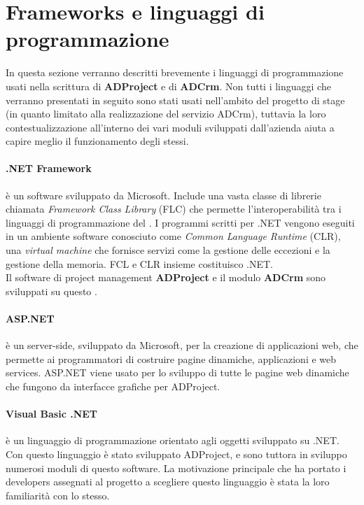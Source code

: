 \documentclass[12pt,a4paper,twoside,openright,english]{book}
\begin{document}
\section{Frameworks e linguaggi di programmazione}
In questa sezione verranno descritti brevemente i linguaggi di programmazione usati nella scrittura di \textbf{ADProject} e di \textbf{ADCrm}.
Non tutti i linguaggi che verranno presentati in seguito sono stati usati nell'ambito del progetto di stage (in quanto limitato alla realizzazione del servizio \large{ADCrm}), tuttavia la loro contestualizzazione all'interno dei vari moduli sviluppati dall'azienda aiuta a capire meglio il funzionamento degli stessi.

\paragraph{.NET Framework}
è un  software sviluppato da Microsoft. Include una vasta classe di librerie chiamata \textit{Framework Class Library} (FLC) che permette l'interoperabilità tra i linguaggi di programmazione del . I programmi scritti per .NET vengono eseguiti in un ambiente software conosciuto come \textit{Common Language Runtime} (CLR), una \textit{virtual machine}  che fornisce servizi come la gestione delle eccezioni e la gestione della memoria. FCL e CLR insieme costituisco .NET.\\
Il software di project management \textbf{ADProject} e il modulo \textbf{ADCrm} sono sviluppati su questo .

\paragraph{ASP.NET}
 è un  server-side, sviluppato da Microsoft, per la creazione di applicazioni web, che permette ai programmatori di costruire pagine dinamiche, applicazioni e web services.
 ASP.NET viene usato per lo sviluppo di tutte le pagine web dinamiche che fungono da interfacce grafiche per ADProject.

\paragraph{Visual Basic .NET}
è un linguaggio di programmazione orientato agli oggetti sviluppato su .NET.\\
Con questo linguaggio è stato sviluppato ADProject, e sono tuttora in sviluppo numerosi moduli di questo software. La motivazione principale che ha portato i developers assegnati al progetto a scegliere questo linguaggio è stata la loro familiarità con lo stesso. 
\end{document}
